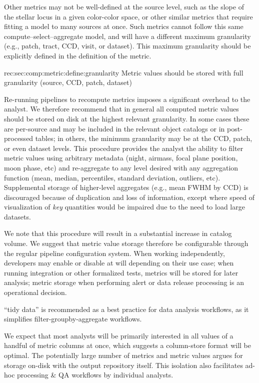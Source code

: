 Other metrics may not be well-defined at the source level, such as the slope of the stellar locus in a given color-color space, or other similar metrics that require fitting a model to many sources at once.
Such metrics cannot follow this same compute--select--aggregate model, and will have a different maximum granularity (e.g., patch, tract, CCD, visit, or dataset).
This maximum granularity should be explicitly defined in the definition of the metric.

\begin{recommendation}
    {rec:sec:comp:metric:define:granularity}
    {Metric values should be stored with full granularity (source, CCD, patch, dataset)}
\end{recommendation}

Re-running pipelines to recompute metrics imposes a significant overhead to the analyst.
We therefore recommend that in general all computed metric values should be stored on disk at the highest relevant granularity.
In some cases these are per-source and may be included in the relevant object catalogs or in post-processed tables; in others, the minimum granularity may be at the CCD, patch, or even dataset levels.
This procedure provides the analyst the ability to filter metric values using arbitrary metadata (night, airmass, focal plane position, moon phase, etc) and re-aggregate to any level desired with any aggregation function (mean, median, percentiles, standard deviation, outliers, etc).
Supplemental storage of higher-level aggregates (e.g., mean FWHM by CCD) is discouraged because of duplication and loss of information, except where speed of visualization of \emph{key} quantities would be impaired due to the need to load large datasets.

We note that this procedure will result in a substantial increase in catalog volume.
We suggest that metric value storage therefore be configurable through the regular pipeline configuration system.
When working independently, developers may enable or disable at will depending on their use case; when running integration or other formalized tests, metrics will be stored for later analysis; metric storage when performing alert or data release processing is an operational decision.

``\Gls{tidy data}'' \citep{JSSv059i10} is recommended as a best practice for data analysis workflows, as it simplifies filter-groupby-aggregate workflows.

We expect that most analysts will be primarily interested in all values of a handful of metric columns at once, which suggests a column-store format will be optimal.
The potentially large number of metrics and metric values argues for storage on-disk with the output repository itself.
This isolation also facilitates ad-hoc processing \& QA workflows by individual analysts.

